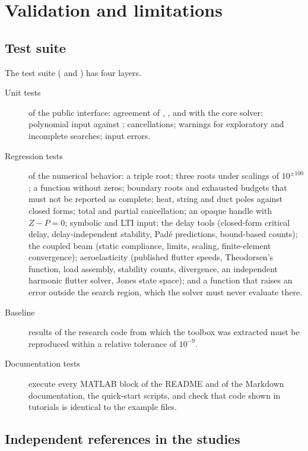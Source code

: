 \chapter{Validation and limitations}\label{ch:validation}

\section{Test suite}

The test suite ( and ) has four
layers.
\begin{description}
  \item[Unit tests] of the public interface: agreement of ,
    ,  and  with the core solver;
    polynomial input against ; cancellations; warnings for
    exploratory and incomplete searches; input errors.
  \item[Regression tests] of the numerical behavior: a triple root; three
    roots under scalings of $10^{\pm100}$; a function without zeros;
    boundary roots and exhausted budgets that must not be reported as
    complete; heat, string and duct poles against closed forms; total and
    partial cancellation; an opaque handle with $Z-P=0$; symbolic and LTI
    input; the delay tools (closed-form critical delay, delay-independent
    stability, Padé predictions, bound-based counts); the coupled beam
    (static compliance, limits, scaling, finite-element convergence);
    aeroelasticity (published flutter speeds, Theodorsen's function,
    load assembly, stability counts, divergence, an independent harmonic
    flutter solver, Jones state space); and a function that raises an error
    outside the search region, which the solver must never evaluate there.
  \item[Baseline] results of the research code from which the toolbox was
    extracted must be reproduced within a relative tolerance of $10^{-9}$.
  \item[Documentation tests] execute every MATLAB block of the README and
    of the Markdown documentation, the quick-start scripts, and check that
    code shown in tutorials is identical to the example files.
\end{description}

\section{Independent references in the studies}

